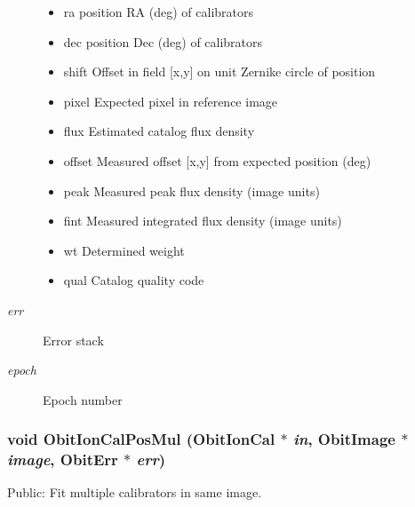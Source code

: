 \begin{Desc}
\begin{description}
\begin{itemize}
\item ra position RA (deg) of calibrators \item dec position Dec (deg) of calibrators \item shift Offset in field [x,y] on unit Zernike circle of position \item pixel Expected pixel in reference image \item flux Estimated catalog flux density \item offset Measured offset [x,y] from expected position (deg) \item peak Measured peak flux density (image units) \item fint Measured integrated flux density (image units) \item wt Determined weight \item qual Catalog quality code \end{itemize}
\item[{\em err}]Error stack \item[{\em epoch}]Epoch number \end{description}
\end{Desc}
\subsubsection{\setlength{\rightskip}{0pt plus 5cm}void Obit\-Ion\-Cal\-Pos\-Mul ({\bf Obit\-Ion\-Cal} $\ast$ {\em in}, {\bf Obit\-Image} $\ast$ {\em image}, {\bf Obit\-Err} $\ast$ {\em err})}\label{ObitIonCal_8h_a12}


Public: Fit multiple calibrators in same image. 

